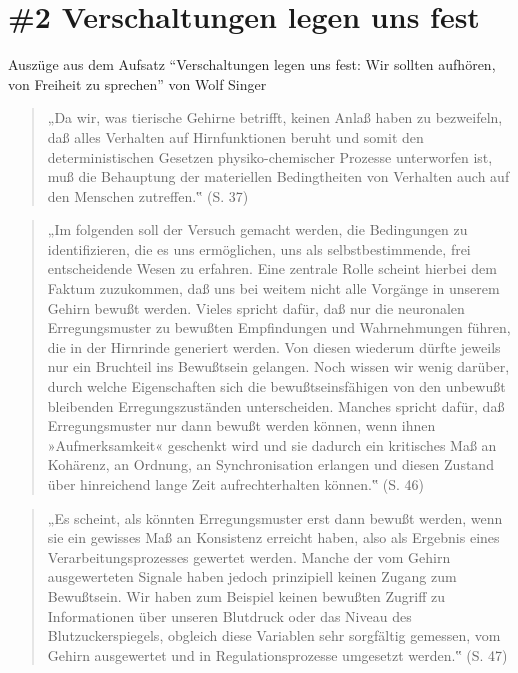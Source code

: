 \documentclass[
  a4paper,
]{report}
\begin{document}
\hypertarget{def-ev2}{%
\section{\#2 Verschaltungen legen uns fest}\label{def-ev2}}

Auszüge aus dem Aufsatz ``Verschaltungen legen uns fest: Wir sollten aufhören, von Freiheit zu sprechen'' von Wolf Singer \citeyearpar{Singer2004}

\begin{quote}
„Da wir, was tierische Gehirne betrifft, keinen Anlaß haben zu bezweifeln, daß alles Verhalten auf Hirnfunktionen beruht und somit den deterministischen Gesetzen physiko-chemischer Prozesse unterworfen ist, muß die Behauptung der materiellen Bedingtheiten von Verhalten auch auf den Menschen zutreffen.‟ (S. 37)
\end{quote}

\begin{quote}
„Im folgenden soll der Versuch gemacht werden, die Bedingungen zu identifizieren, die es uns ermöglichen, uns als selbstbestimmende, frei entscheidende Wesen zu erfahren. Eine zentrale Rolle scheint hierbei dem Faktum zuzukommen, daß uns bei weitem nicht alle Vorgänge in unserem Gehirn bewußt werden. Vieles spricht dafür, daß nur die neuronalen Erregungsmuster zu bewußten Empfindungen und Wahrnehmungen führen, die in der Hirnrinde generiert werden. Von diesen wiederum dürfte jeweils nur ein Bruchteil ins Bewußtsein gelangen. Noch wissen wir wenig darüber, durch welche Eigenschaften sich die bewußtseinsfähigen von den unbewußt bleibenden Erregungszuständen unterscheiden. Manches spricht dafür, daß Erregungsmuster nur dann bewußt werden können, wenn ihnen »Aufmerksamkeit« geschenkt wird und sie dadurch ein kritisches Maß an Kohärenz, an Ordnung, an Synchronisation erlangen und diesen Zustand über hinreichend lange Zeit aufrechterhalten können.‟ (S. 46)
\end{quote}

\begin{quote}
„Es scheint, als könnten Erregungsmuster erst dann bewußt werden, wenn sie ein gewisses Maß an Konsistenz erreicht haben, also als Ergebnis eines Verarbeitungsprozesses gewertet werden. Manche der vom Gehirn ausgewerteten Signale haben jedoch prinzipiell keinen Zugang zum Bewußtsein. Wir haben zum Beispiel keinen bewußten Zugriff zu Informationen über unseren Blutdruck oder das Niveau des Blutzuckerspiegels, obgleich diese Variablen sehr sorgfältig gemessen, vom Gehirn ausgewertet und in Regulationsprozesse umgesetzt werden.‟ (S. 47)
\end{quote}
\end{document}
